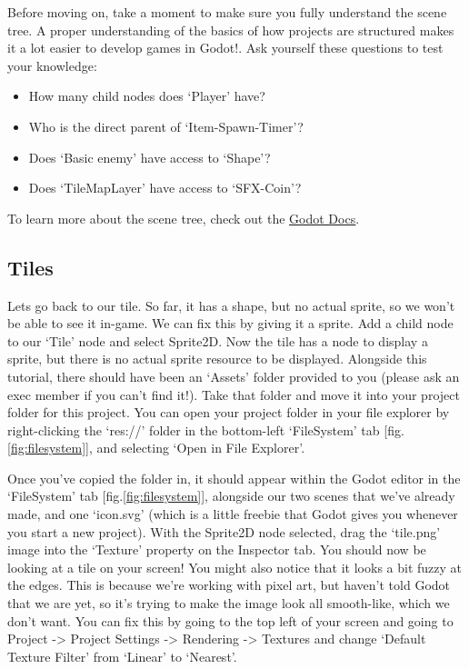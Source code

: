 \documentclass[14pt]{extarticle}
\newcommand{\prettyref}[2]{[{#1}.\ref{#2}]}
\begin{document}
Before moving on, take a moment to make sure you fully understand the scene tree. A proper understanding of the basics of how projects are structured makes it a lot easier to develop games in Godot!. Ask yourself these questions to test your knowledge:
\begin{itemize}
    \item How many child nodes does `Player' have?
    \item Who is the direct parent of `Item-Spawn-Timer'?
    \item Does `Basic enemy' have access to `Shape'?
    \item Does `TileMapLayer' have access to `SFX-Coin'?
\end{itemize}

To learn more about the scene tree, check out the \href{https://docs.godotengine.org/en/stable/tutorials/scripting/scene_tree.html}{\underline{Godot Docs}}.

\subsection*{Tiles}
Lets go back to our tile. So far, it has a shape, but no actual sprite, so we won't be able to see it in-game. We can fix this by giving it a sprite. Add a child node to our `Tile' node and select Sprite2D. Now the tile has a node to display a sprite, but there is no actual sprite resource to be displayed. Alongside this tutorial, there should have been an `Assets' folder provided to you (please ask an exec member if you can't find it!). Take that folder and move it into your project folder for this project. You can open your project folder in your file explorer by right-clicking the `res://' folder in the bottom-left `FileSystem' tab \prettyref{fig}{fig:filesystem}, and selecting `Open in File Explorer'.


Once you've copied the folder in, it should appear within the Godot editor in the `FileSystem' tab \prettyref{fig}{fig:filesystem}, alongside our two scenes that we've already made, and one `icon.svg' (which is a little freebie that Godot gives you whenever you start a new project). With the Sprite2D node selected, drag the `tile.png' image into the `Texture' property on the Inspector tab. You should now be looking at a tile on your screen! You might also notice that it looks a bit fuzzy at the edges. This is because we're working with pixel art, but haven't told Godot that we are yet, so it's trying to make the image look all smooth-like, which we don't want. You can fix this by going to the top left of your screen and going to Project -> Project Settings -> Rendering -> Textures and change `Default Texture Filter' from `Linear' to `Nearest'.
\end{document}
